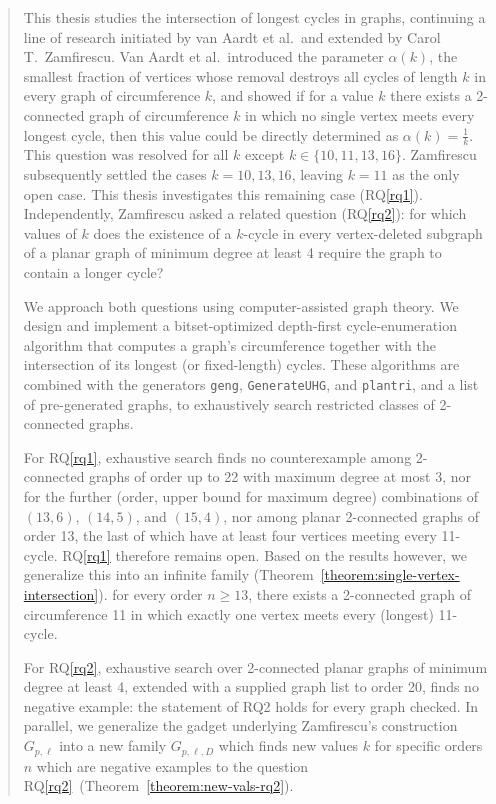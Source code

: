 \documentclass[master=ecws,masteroption=Computational Informatics]{kulemt}
\newcounter{rq}
\begin{document}
\begin{abstract}
This thesis studies the intersection of longest cycles in graphs, continuing a line of research initiated by van Aardt et al.\ and extended by Carol T.\ Zamfirescu. Van Aardt et al.\ introduced the parameter $\alpha(k)$, the smallest fraction of vertices whose removal destroys all cycles of length $k$ in every graph of circumference $k$, and showed if for a value $k$ there exists a 2-connected graph of circumference $k$ in which no single vertex meets every longest cycle, then this value could be directly determined as $\alpha(k) = \frac{1}{k}$. This question was resolved for all $k$ except $k \in \{10, 11, 13, 16\}$. Zamfirescu subsequently settled the cases $k = 10, 13, 16$, leaving $k = 11$ as the only open case. This thesis investigates this remaining case (RQ\ref{rq1}). Independently, Zamfirescu asked a related question (RQ\ref{rq2}): for which values of $k$ does the existence of a $k$-cycle in every vertex-deleted subgraph of a planar graph of minimum degree at least 4 require the graph to contain a longer cycle?

We approach both questions using computer-assisted graph theory. We design and implement a bitset-optimized depth-first cycle-enumeration algorithm that computes a graph's circumference together with the intersection of its longest (or fixed-length) cycles. These algorithms are combined with the generators \texttt{geng}, \texttt{GenerateUHG}, and \texttt{plantri}, and a list of pre-generated graphs, to exhaustively search restricted classes of 2-connected graphs.

For RQ\ref{rq1}, exhaustive search finds no counterexample among 2-connected graphs of order up to 22 with maximum degree at most 3, nor for the further (order, upper bound for maximum degree) combinations of $(13,6)$, $(14,5)$, and $(15,4)$, nor among planar 2-connected graphs of order 13, the last of which have at least four vertices meeting every 11-cycle. RQ\ref{rq1} therefore remains open. Based on the results however, we generalize this into an infinite family (Theorem~\ref{theorem:single-vertex-intersection}). for every order $n \ge 13$, there exists a 2-connected graph of circumference 11 in which exactly one vertex meets every (longest) 11-cycle.

For RQ\ref{rq2}, exhaustive search over 2-connected planar graphs of minimum degree at least 4, extended with a supplied graph list to order 20, finds no negative example: the statement of RQ2 holds for every graph checked. In parallel, we generalize the gadget underlying Zamfirescu's construction $G_{p,\ell}$ into a new family $G_{p,\ell,D}$ which finds new values $k$ for specific orders $n$ which are negative examples to the question RQ\ref{rq2}~(Theorem~\ref{theorem:new-vals-rq2}).
\end{abstract}
\end{document}
